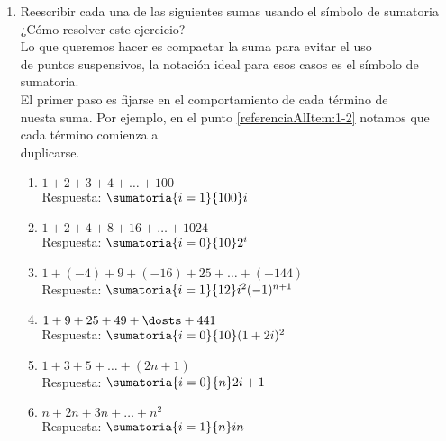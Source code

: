 \ejercicio
\begin{enumerate}[label=\roman*)]
    \item Reescribir cada una de las siguientes sumas usando el símbolo de sumatoria\\ 
    
    ¿Cómo resolver este ejercicio?\\
    Lo que queremos hacer es compactar la suma para evitar el uso\\
    de puntos suspensivos, la notación ideal para esos casos es el símbolo de sumatoria.\\
    El primer paso es fijarse en el comportamiento de cada término de\\
    nuesta suma. Por ejemplo, en el punto \ref{referenciaAlItem:1-2} notamos que cada término comienza a\\
    duplicarse.


    \begin{enumerate}[label=\alph*)] 
        \item  $1 + 2 + 3 + 4 + \dots + 100$\\
        Respuesta: $ \sumatoria{i=1}{100}i $\\

        \item\label{referenciaAlItem:1-2}  $1 + 2 + 4 + 8 + 16 + \dots + 1024$\\
        Respuesta: $ \sumatoria{i=0}{10}2^i $\\

      \item  $1 + (-4) + 9 + (-16) + 25 + \dots + (-144)$\\
        Respuesta: $ \sumatoria{i=1}{12}i^2(-1)^{n+1} $\\

        \item $1 + 9 + 25 + 49 + \dosts + 441$\\
        Respuesta: $ \sumatoria{i=0}{10}(1+2i)^2 $\\

        \item $1 + 3 + 5 + \dots + (2n + 1)$\\
        Respuesta: $ \sumatoria{i=0}{n} 2i+1 $\\

        \item $n + 2n + 3n + \dots + n^2$\\
        Respuesta: $ \sumatoria{i=1}{n} in $\\
    \end{enumerate}
\end{enumerate}

